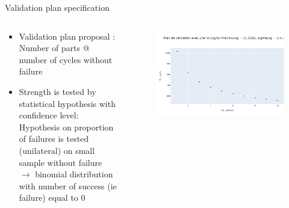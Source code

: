 \documentclass{renault-template}
\begin{document}
\begin{frame}{Validation plan specification}
\begin{columns}[t]
    \begin{column}{0.6\textwidth}
      \begin{itemize}
      \item Validation plan proposal : \\
        Number of parts @ number of cycles without failure
      \item Strength is tested by statistical hypothesis with confidence level:\\
        Hypothesis on proportion of failures is tested (unilateral) on small sample without failure \\
        $\rightarrow$ binomial distribution with number of success (ie failure) equal to 0
      \end{itemize}
    \end{column}
    \begin{column}{0.4\textwidth}
      \begin{figure}
        \includegraphics[width=\textwidth]{Illustration_StaRe/validation_plan.png}
      \end{figure}
    \end{column}
  \end{columns}
\end{frame}
\end{document}
